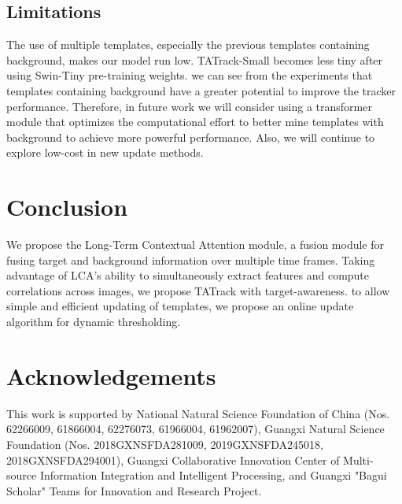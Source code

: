 \documentclass[letterpaper]{article} \usepackage{aaai23}  \usepackage{times}  \usepackage{helvet}  \usepackage{courier}  \usepackage[hyphens]{url}  \usepackage{graphicx} \urlstyle{rm} \def\UrlFont{\rm}  \usepackage{natbib}  \usepackage{caption} \frenchspacing  \setlength{\pdfpagewidth}{8.5in}  \setlength{\pdfpageheight}{11in}  \usepackage{algorithm}
\begin{document}
\subsection{Limitations}
The use of multiple templates, especially the previous templates containing background, makes our model run low. TATrack-Small becomes less tiny after using Swin-Tiny pre-training weights. we can see from the experiments that templates containing background have a greater potential to improve the tracker performance. Therefore, in future work we will consider using a transformer module that optimizes the computational effort to better mine templates with background to achieve more powerful performance. Also, we will continue to explore low-cost in new update methods.

\section{Conclusion}
We propose the Long-Term Contextual Attention module, a fusion module for fusing target and background information over multiple time frames. Taking advantage of LCA's ability to simultaneously extract features and compute correlations across images, we propose TATrack with target-awareness. to allow simple and efficient updating of templates, we propose an online update algorithm for dynamic thresholding.

\section{Acknowledgements}
This work is supported by National Natural Science Foundation of China (Nos. 62266009, 61866004, 62276073, 61966004, 61962007), Guangxi Natural Science Foundation (Nos. 2018GXNSFDA281009, 2019GXNSFDA245018, 2018GXNSFDA294001), Guangxi Collaborative Innovation Center of Multi-source Information Integration and Intelligent Processing, and Guangxi "Bagui Scholar" Teams for Innovation and Research Project.


\end{document}
